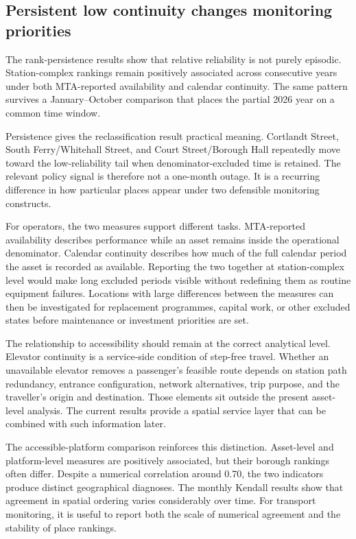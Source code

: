 \subsection{Persistent low continuity changes monitoring priorities}

The rank-persistence results show that relative reliability is not purely episodic. Station-complex rankings remain positively associated across consecutive years under both MTA-reported availability and calendar continuity. The same pattern survives a January--October comparison that places the partial 2026 year on a common time window.

Persistence gives the reclassification result practical meaning. Cortlandt Street, South Ferry/Whitehall Street, and Court Street/Borough Hall repeatedly move toward the low-reliability tail when denominator-excluded time is retained. The relevant policy signal is therefore not a one-month outage. It is a recurring difference in how particular places appear under two defensible monitoring constructs.

For operators, the two measures support different tasks. MTA-reported availability describes performance while an asset remains inside the operational denominator. Calendar continuity describes how much of the full calendar period the asset is recorded as available. Reporting the two together at station-complex level would make long excluded periods visible without redefining them as routine equipment failures. Locations with large differences between the measures can then be investigated for replacement programmes, capital work, or other excluded states before maintenance or investment priorities are set.

The relationship to accessibility should remain at the correct analytical level. Elevator continuity is a service-side condition of step-free travel. Whether an unavailable elevator removes a passenger's feasible route depends on station path redundancy, entrance configuration, network alternatives, trip purpose, and the traveller's origin and destination. Those elements sit outside the present asset-level analysis. The current results provide a spatial service layer that can be combined with such information later.

The accessible-platform comparison reinforces this distinction. Asset-level and platform-level measures are positively associated, but their borough rankings often differ. Despite a numerical correlation around 0.70, the two indicators produce distinct geographical diagnoses. The monthly Kendall results show that agreement in spatial ordering varies considerably over time. For transport monitoring, it is useful to report both the scale of numerical agreement and the stability of place rankings.

